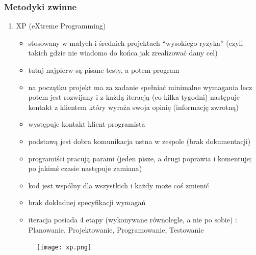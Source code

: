 \documentclass[a4paper,12pt,oneside]{book}
\begin{document}
				\subsubsection{Metodyki zwinne}
				\begin{enumerate}
					\item XP (eXtreme Programming)
					\begin{itemize}
						\item stosowany w małych i średnich projektach “wysokiego ryzyka” (czyli takich
						gdzie nie wiadomo do końca jak zrealizować dany cel)
						\item tutaj najpierw są pisane testy, a potem program
						\item na początku projekt ma za zadanie spełniać minimalne wymagania lecz
						potem jest rozwijany i z każdą iteracją (co kilka tygodni) następuje kontakt z
						klientem który wyraża swoja opinię (informację zwrotną)
						\item występuje kontakt klient-programista
						\item podstawą jest dobra komunikacja ustna w zespole (brak dokumentacji)
						\item programiści pracują parami (jeden pisze, a drugi poprawia i komentuje; po
						jakimś czasie następuje zamiana)
						\item kod jest wspólny dla wszystkich i każdy może coś zmienić
						\item brak dokładnej specyfikacji wymagań
						\item iteracja posiada 4 etapy (wykonywane równolegle, a nie po sobie) :
						Planowanie, Projektowanie, Programowanie, Testowanie					
					\end{itemize}
					\begin{figure}[h!]
						\centering\texttt{[image: xp.png]}
					\end{figure}
				

\end{enumerate}
\end{document}

